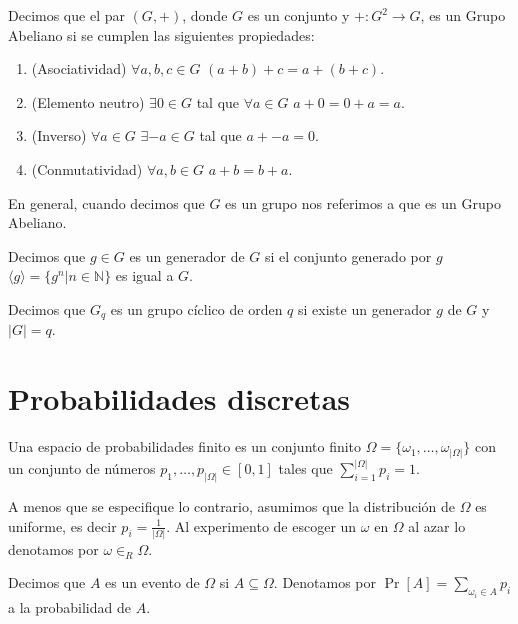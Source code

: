 \begin{definicion}
Decimos que el par $(G,+)$, donde $G$ es un conjunto y
$+:G^2 \to G$, es un Grupo Abeliano si se cumplen las siguientes propiedades:
\begin{enumerate}
\item (Asociatividad) $\forall a,b,c \in G$ $(a+b)+c=a+(b+c)$.
\item (Elemento neutro) $\exists 0 \in G$ tal que $\forall a \in G$ $a+0 = 0+a = a$.
\item (Inverso) $\forall a \in G$ $\exists -a \in G$ tal que $a+-a = 0$.
\item (Conmutatividad) $\forall a,b \in G$ $a+b = b+a$.
\end{enumerate}
\end{definicion}

En general, cuando decimos que $G$ es un grupo nos referimos a que es un Grupo Abeliano.

\begin{definicion}[Generador]
Decimos que $g\in G$ es un generador de $G$ si el conjunto generado por $g$ 
$\langle g \rangle = \{g^n|n\in\mathbb{N}\}$ es igual a $G$.
\end{definicion}

\begin{definicion}
Decimos que $G_q$ es un grupo cíclico de orden $q$ si existe un generador
$g$ de $G$ y $|G| = q$.

\end{definicion}

\section{Probabilidades discretas}

\begin{definicion}
Una espacio de probabilidades finito es un conjunto finito
$\Omega = \{\omega_1, \ldots, \omega_{|\Omega|}\}$ con un conjunto
de números $p_1, \ldots, p_{|\Omega|} \in [0,1]$ tales que
$\sum_{i=1}^{|\Omega|}p_i=1$.
\end{definicion}

A menos que se especifique lo contrario, asumimos que la distribución
de $\Omega$ es uniforme, es decir $p_i = \frac{1}{|\Omega|}$. Al experimento
de escoger un $\omega$ en $\Omega$ al azar lo denotamos por $\omega \in_R \Omega$.

\begin{definicion}[Evento]
Decimos que $A$ es un evento de $\Omega$ si $A \subseteq \Omega$. Denotamos
por $\Pr[A] = \sum_{\omega_i \in A}p_i$  a la probabilidad de $A$.
\end{definicion}

